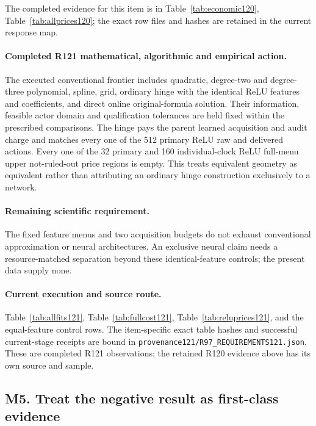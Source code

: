 The completed evidence for this item is in Table~\ref{tab:economic120}, Table~\ref{tab:allprices120}; the exact row files and hashes are retained in the current response map.

\paragraph{Completed R121 mathematical, algorithmic and empirical action.}
The executed conventional frontier includes quadratic, degree-two and degree-three polynomial, spline, grid, ordinary hinge with the identical ReLU features and coefficients, and direct online original-formula solution. Their information, feasible actor domain and qualification tolerances are held fixed within the prescribed comparisons. The hinge pays the parent learned acquisition and audit charge and matches every one of the 512 primary ReLU raw and delivered actions. Every one of the 32 primary and 160 individual-clock ReLU full-menu upper not-ruled-out price regions is empty. This treats equivalent geometry as equivalent rather than attributing an ordinary hinge construction exclusively to a network.

\paragraph{Remaining scientific requirement.}
The fixed feature menus and two acquisition budgets do not exhaust conventional approximation or neural architectures. An exclusive neural claim needs a resource-matched separation beyond these identical-feature controls; the present data supply none.

\paragraph{Current execution and source route.}
Table~\ref{tab:allfits121}, Table~\ref{tab:fullcost121}, Table~\ref{tab:reluprices121}, and the equal-feature control rows.
The item-specific exact table hashes and successful current-stage receipts are bound in \nolinkurl{provenance121/R97_REQUIREMENTS121.json}. These are completed R121 observations; the retained R120 evidence above has its own source and sample.

\subsection{M5. Treat the negative result as first-class evidence}
\label{response121:M5}

